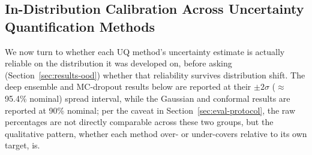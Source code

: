 \documentclass[a4paper,fleqn]{cas-sc}
\begin{document}
\subsection{In-Distribution Calibration Across Uncertainty Quantification Methods}
\label{sec:results-id-calibration}

We now turn to whether each UQ method's uncertainty estimate is actually reliable on the distribution it was developed on, before asking (Section~\ref{sec:results-ood}) whether that reliability survives distribution shift. The deep ensemble and MC-dropout results below are reported at their $\pm2\sigma$ ($\approx$95.4\% nominal) spread interval, while the Gaussian and conformal results are reported at 90\% nominal; per the caveat in Section~\ref{sec:eval-protocol}, the raw percentages are not directly comparable across these two groups, but the qualitative pattern, whether each method over- or under-covers relative to its own target, is.
\end{document}

